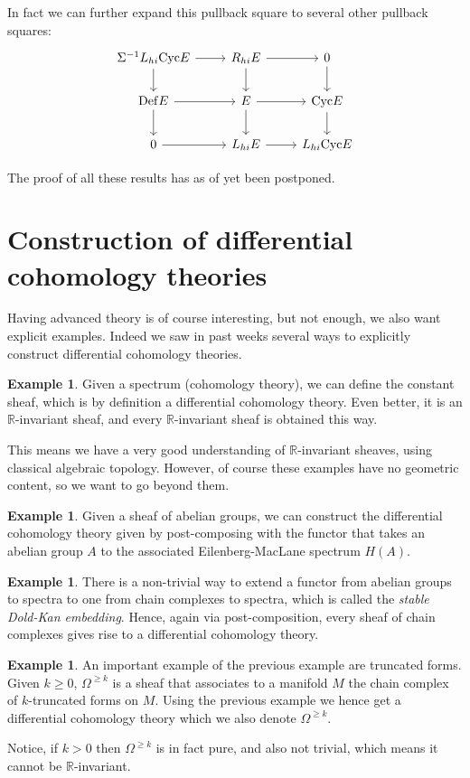 \documentclass[10pt]{amsart}
\newcommand{\bR}{\mathbb{R}}
\newcommand{\Def}{\mathrm{Def}}
\newcommand{\Cyc}{\mathrm{Cyc}}
\theoremstyle{definition}
\newtheorem{example}[equation]{Example}
\theoremstyle{remark}
\numberwithin{equation}{section}
\begin{document}
In fact we can further expand this pullback square to several other pullback squares:
 \[
  \begin{tikzcd}
    \Sigma^{-1}L_{hi}\Cyc E \arrow[d] \arrow[r] & R_{hi}E \arrow[r] \arrow[d] & 0 \arrow[d] \\ 
    \Def E \arrow[r] \arrow[d] & E \arrow[r] \arrow[d] & \Cyc E \arrow[d] \\ 
    0 \arrow[r] & L_{hi}E \arrow[r] & L_{hi}\Cyc E
  \end{tikzcd}
 \]

The proof of all these results has as of yet been postponed.

\section{Construction of differential cohomology theories}
Having advanced theory is of course interesting, but not enough, we also want explicit examples. Indeed we saw in past weeks several ways to explicitly construct differential cohomology theories.

\begin{example}
  Given a spectrum (cohomology theory), we can define the constant sheaf, which is by definition a differential cohomology theory. Even better, it is an $\bR$-invariant sheaf, and every $\bR$-invariant sheaf is obtained this way.
\end{example}

This means we have a very good understanding of $\bR$-invariant sheaves, using classical algebraic topology. However, of course these examples have no geometric content, so we want to go beyond them.

\begin{example}
  Given a sheaf of abelian groups, we can construct the differential cohomology theory given by post-composing with the functor that takes an abelian group $A$ to the associated Eilenberg-MacLane spectrum $H(A)$. 
\end{example}

\begin{example}
  There is a non-trivial way to extend a functor from abelian groups to spectra to one from chain complexes to spectra, which is called the \emph{stable Dold-Kan embedding}. Hence, again via post-composition, every sheaf of chain complexes gives rise to a differential cohomology theory.
\end{example}

\begin{example}
 An important example of the previous example are truncated forms. Given $k \geq 0$, $\Omega^{\geq k}$ is a sheaf that associates to a manifold $M$ the chain complex of $k$-truncated forms on $M$. Using the previous example we hence get a differential cohomology theory which we also denote $\Omega^{\geq k }$.

 Notice, if $k > 0$ then $\Omega^{\geq k}$ is in fact pure, and also not trivial, which means it cannot be $\bR$-invariant.
\end{example}
\end{document}
